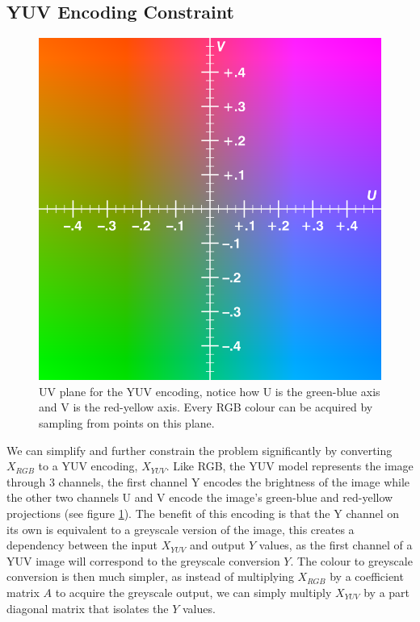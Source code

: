 \documentclass{l4proj}
\begin{document}
\subsection{YUV Encoding Constraint}
\label{yuv-encoding}
\begin{figure}[]
    \centering
    \includegraphics[width=0.5\linewidth]{images/UVPlane.png}    

    \caption{UV plane for the YUV encoding, notice how U is the green-blue axis and V is the red-yellow axis. Every RGB colour can be acquired by sampling from points on this plane.}

    \label{fig:uvplane} 
\end{figure}
We can simplify and further constrain the problem significantly by converting $X_{RGB}$ to a YUV encoding, $X_{YUV}$. Like RGB, the YUV model represents the image through 3 channels, the first channel Y encodes the brightness of the image while the other two channels U and V encode the image's green-blue and red-yellow projections (see figure \ref{fig:uvplane}). The benefit of this encoding is that the Y channel on its own is equivalent to a greyscale version of the image, this creates a dependency between the input $X_{YUV}$ and output $Y$ values, as the first channel of a YUV image will correspond to the greyscale conversion $Y$. The colour to greyscale conversion is then much simpler, as instead of multiplying $X_{RGB}$ by a coefficient matrix $A$ to acquire the greyscale output, we can simply multiply $X_{YUV}$ by a part diagonal matrix that isolates the $Y$ values.
\end{document}
